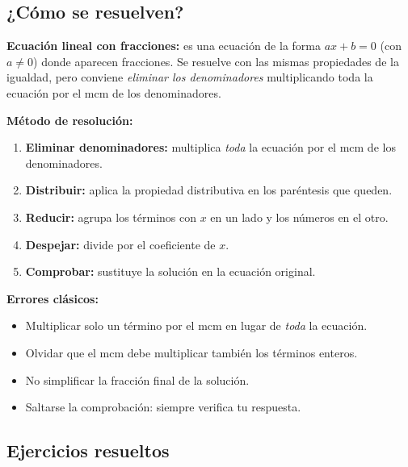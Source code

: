 \documentclass[12pt, letterpaper]{article}
\begin{document}
\subsection{¿Cómo se resuelven?}

\begin{cuadroteoria}
  \textbf{Ecuación lineal con fracciones:} es una ecuación de la forma $ax + b = 0$ (con $a \neq 0$) donde aparecen fracciones. Se resuelve con las mismas propiedades de la igualdad, pero conviene \emph{eliminar los denominadores} multiplicando toda la ecuación por el mcm de los denominadores.
\end{cuadroteoria}
\newpage
\begin{cuadropasos}
  \textbf{Método de resolución:}
  \begin{enumerate}[leftmargin=*]
    \item \textbf{Eliminar denominadores:} multiplica \emph{toda} la ecuación por el mcm de los denominadores.
    \item \textbf{Distribuir:} aplica la propiedad distributiva en los paréntesis que queden.
    \item \textbf{Reducir:} agrupa los términos con $x$ en un lado y los números en el otro.
    \item \textbf{Despejar:} divide por el coeficiente de $x$.
    \item \textbf{Comprobar:} sustituye la solución en la ecuación original.
  \end{enumerate}
\end{cuadropasos}

\begin{cuadroadvertencia}
  \textbf{Errores clásicos:}
  \begin{itemize}[leftmargin=*]
    \item Multiplicar solo un término por el mcm en lugar de \emph{toda} la ecuación.
    \item Olvidar que el mcm debe multiplicar también los términos enteros.
    \item No simplificar la fracción final de la solución.
    \item Saltarse la comprobación: siempre verifica tu respuesta.
  \end{itemize}
\end{cuadroadvertencia}

\subsection{Ejercicios resueltos}
\end{document}
